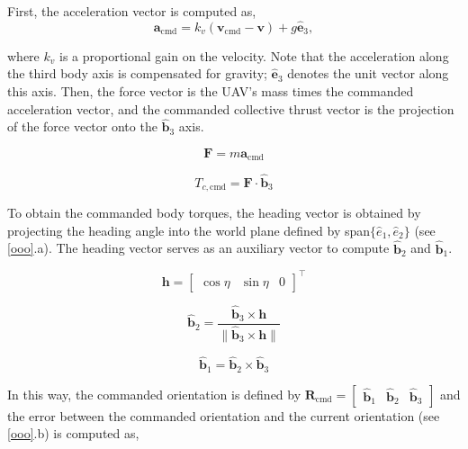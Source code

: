 First, the acceleration vector is computed as,
\begin{equation}
    \mathbf{a}_{\text{cmd}} = k_v (\mathbf{v}_{\text{cmd}} - \mathbf{v}) + g \mathbf{\hat{e}}_3,
\end{equation}

\noindent where $k_v$ is a proportional gain on the velocity. 
Note that the acceleration along the third body axis is compensated for gravity; $\mathbf{\hat{e}}_3$ denotes the unit vector along this axis.
Then, the force vector is the \ac{UAV}'s mass times the commanded acceleration vector, and the commanded collective thrust vector is the projection of the force vector onto the $\mathbf{\hat{b}}_3$ axis.

\begin{equation}
    \mathbf{F} = m \mathbf{a}_{\text{cmd}} 
\end{equation}

\begin{equation}\label{eq:geo_thrust}
    T_{c, \text{cmd}} = \mathbf{F} \cdot \mathbf{\hat{b}}_3
\end{equation}



To obtain the commanded body torques, the heading vector is obtained by projecting the heading angle into the world plane defined by span$\{\hat{e}_1, \hat{e}_2\}$ (see \autoref{ooo}.a).
The heading vector serves as an auxiliary vector to compute $\mathbf{\hat{b}}_2$ and $\mathbf{\hat{b}}_1$. 

\begin{equation} \mathbf{h} = \begin{bmatrix} \cos{\eta} & \sin{\eta} & 0 \end{bmatrix} ^\top \end{equation} 

\begin{equation}
    \hat{\mathbf{b}}_2 = \frac{\hat{\mathbf{b}}_3 \times \mathbf{h}}{\|\hat{\mathbf{b}}_3 \times \mathbf{h}\|}
\end{equation}

\begin{equation}
    \hat{\mathbf{b}}_1 = \hat{\mathbf{b}}_2 \times \hat{\mathbf{b}}_3
\end{equation}

\noindent In this way, the commanded orientation is defined by $\mathbf{R}_{\text{cmd}} = \begin{bmatrix}
    \hat{\mathbf{b}}_1 & \hat{\mathbf{b}}_2 & \hat{\mathbf{b}}_3
\end{bmatrix}$ and the error between the commanded orientation and the current orientation (see \autoref{ooo}.b) is computed as, 

